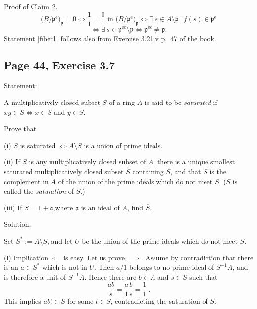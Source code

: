 \documentclass[parskip=half,fontsize=12pt]{scrartcl}%
\newcommand{\oo}{\operatorname}\newcommand{\ooo}{\operatorname*}
\newcommand{\mf}{\mathfrak}
\newcommand{\aaa}{\mf a}
\newcommand{\ppp}{\mf p}
\begin{document}
Proof of Claim~2. 
$$
\big(B/\ppp^{\oo e}\big)_\ppp=0\iff\frac11=\frac01\text{ in }\big(B/\ppp^{\oo e}\big)_\ppp\iff\exists\ s\in A\setminus\ppp\ |\ f(s)\in\ppp^{\oo e}
$$ 
$$
\iff\exists\ s\in\ppp^{\oo{ec}}\setminus\ppp\iff\ppp^{\oo{ec}}\ne\ppp.
$$ 
Statement \eqref{fiber1} follows also from Exercise 3.21iv p.~47 of the book.



\subsection{Page 44, Exercise 3.7}%

Statement:

A multiplicatively closed subset $S$ of a ring $A$ is said to be \emph{saturated} if $xy\in S\iff x\in S$ and $y\in S$. %

Prove that

(i) $S$ is saturated $\iff A\setminus S$ %
is a union of prime ideals.

(ii) If $S$ is any multiplicatively closed subset of $A$, there is a unique smallest saturated multiplicatively closed subset $\overline S$ containing $S$, and that $\overline S$ is the complement in $A$ of the union of the prime ideals which do not meet $S$. ($S$ is called the \emph{saturation} of $S$.)

(iii) If $S=1+\aaa$,where $\aaa$ is an ideal of $A$, find $\overline S$.

Solution:

Set $S^*:=A\setminus S$, and let $U$ be the union of the prime ideals which do not meet $S$.

(i) Implication $\Longleftarrow$ is easy. Let us prove $\implies$. Assume by contradiction that there is an $a\in S^*$ which is not in $U$. Then $a/1$ belongs to no prime ideal of $S^{-1}A$, and is therefore a unit of $S^{-1}A$. Hence there are $b\in A$ and $s\in S$ such that 
$$
\frac{ab}s=\frac a1\frac bs=\frac11\ .
$$ 
This implies $abt\in S$ for some $t\in S$, contradicting the saturation of $S$.
\end{document}
